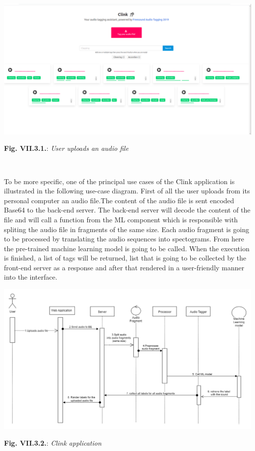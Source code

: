 \documentclass[11pt, a4papper]{report}
\theoremstyle{plain}
\theoremstyle{definition}
\theoremstyle{definition}
\theoremstyle{proposition}
\begin{document}
\begin{center}
\includegraphics[scale=0.26]{click-app-fe.png}
\end{center}
\begin{center}
\textbf{Fig. VII.3.1.}: \textit{User uploads an audio file}
\end{center}
\

To be more specific, one of the principal use cases of the Clink application is illustrated in the following use-case diagram. First of all the user uploads from its personal computer an audio file.The content of the audio file is sent encoded Base64 to the back-end server. The back-end server will decode the content of the file and will call a function from the ML component which is responsible with spliting the audio file in fragments of the same size. Each audio fragment is going to be processed by translating the audio sequences into spectograms. From here the pre-trained machine learning model is going to be called. When the execution is finished, a list of tags will be returned, list that is going to be collected by the front-end server as a response and after that rendered in a user-friendly manner into the interface.

\begin{center}
\includegraphics[scale=0.45]{user-uploads-audio.png}
\end{center}
\begin{center}
\textbf{Fig. VII.3.2.}: \textit{Clink application}
\end{center}
\end{document}
